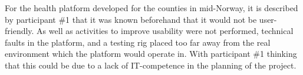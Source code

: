 
For the health platform developed for the counties in mid-Norway, it is described by participant \#1 that it was known beforehand that it would not be user-friendly. As well as activities to improve usability were not performed, technical faults in the platform, and a testing rig placed too far away from the real environment which the platform would operate in. With participant \#1 thinking that this could be due to a lack of IT-competence in the planning of the project.






